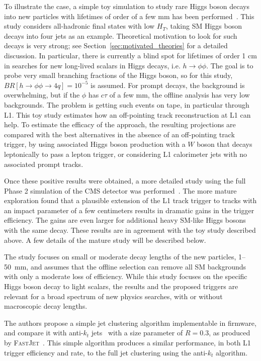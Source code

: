 To illustrate the case, a simple toy simulation to study rare Higgs boson decays into new particles with lifetimes of order of a few mm has been performed~\cite{Gershtein:2017tsv}. This study considers all-hadronic final states with low $H_T$, taking SM Higgs boson decays into four jets as an example. Theoretical motivation to look for such decays is very strong; see Section~\ref{sec:motivated_theories} for a detailed discussion. In particular, there is currently
a blind spot for lifetimes of order 1 cm in searches for new long-lived scalars
in Higgs decays, i.e. \ensuremath{h \to \phi\phi}\xspace. The goal is to probe very small branching fractions of the Higgs boson, so for this study, $BR[h\rightarrow\phi\phi\rightarrow 4q] = 10^{-5}$ is assumed. For prompt decays, the background is overwhelming, but if the $\phi$ has $c\tau$ of a few mm, the offline analysis has very low backgrounds. The problem is getting such events on tape, in particular through L1. This toy study estimates how an off-pointing track reconstruction at L1 can help. To estimate the efficacy of the approach, the resulting projections are compared with the best alternatives in the absence of an off-pointing track trigger, by using associated Higgs boson production with a $W$ boson that decays leptonically to pass a lepton trigger, or considering L1 calorimeter jets with no associated prompt tracks.


Once these positive results were obtained, a more detailed study using the full
Phase 2 simulation of the CMS detector was performed~\cite{CMS:2018qgk}.
The more mature exploration found that a plausible extension of
the L1 track trigger to tracks with an impact parameter of a few centimeters results in
dramatic gains in the trigger efficiency. The gains are even larger for additional heavy
SM-like Higgs bosons with the same decay. These results are in agreement with the toy study described above.
A few details of the mature study will be described below.

The study focuses on small or moderate decay lengths of the new particles, 1--50~mm, and assumes
that the offline selection can remove all SM backgrounds with only a moderate loss of efficiency.
While this study focuses on the specific Higgs boson decay to light scalars,
the results and the proposed triggers are relevant for a broad spectrum of new physics searches, with or without macroscopic decay lengths.

The authors propose a simple jet clustering algorithm implementable in firmware, and compare it with anti-\ensuremath{k_t}\xspace jets~\cite{Cacciari:2008gp} with a size parameter of $R = 0.3$,
as produced by \textsc{FastJet}\xspace~\cite{Cacciari:2011ma}. This simple algorithm produces a similar performance, in both L1 trigger efficiency and rate,
to the full jet clustering using the anti-\ensuremath{k_t}\xspace algorithm.


